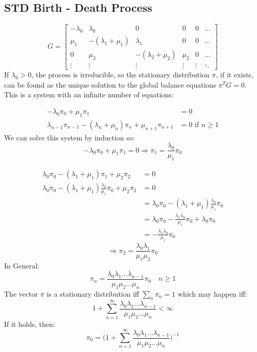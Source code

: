 \subsection{STD Birth - Death Process}
$$
G = \begin{bmatrix}
-\lambda_0 & \lambda_0 & 0 & 0 & 0 & \hdots \\
\mu_1 & -(\lambda_1 + \mu_1) & \lambda_1 & 0 & 0 & \hdots\\
0 & \mu_2 & -(\lambda_2 + \mu_2) & \mu_2 & 0 & \hdots\\
\vdots & \vdots & \vdots & \vdots & \vdots & \ddots
\end{bmatrix}
$$
If $\lambda_0 > 0 $, the process is irreducible, so the stationary distribution $\pi$, if it exists, can be found as the unique solution to the global balance equations $\pi^TG = 0$. This is a system with an infinite number of equations:

\begin{align*}
-\lambda_0\pi_0 + \mu_1\pi_1 &= 0\\
\lambda_{n-1}\pi_{n-1} - (\lambda_n + \mu_n)\pi_n + \mu_{n+1}\pi_{n+1} &= 0 \text{ if } n \geq 1
\end{align*}
We can solve this system by induction so:
$$
-\lambda_0\pi_0 + \mu_1\pi_1 = 0  \Rightarrow \pi_1 = \frac{\lambda_0}{\mu_1}\pi_0
$$

\begin{align*}
\lambda_{0}\pi_{0} - (\lambda_1 + \mu_1)\pi_1 + \mu_{2}\pi_{2} &= 0\\
\lambda_{0}\pi_{0} - (\lambda_1 + \mu_1)\frac{\lambda_0}{\mu_1}\pi_0 + \mu_{2}\pi_{2} &= 0\\
&= \lambda_0\pi_0 - (\lambda_1 + \mu_1)\frac{\lambda_0}{\mu_1}\pi_0\\
&= \lambda_0\pi_0 - \frac{\lambda_1\lambda_0}{\mu_1}\pi_0 +  \lambda_0\pi_0\\
&= - \frac{\lambda_1\lambda_0}{\mu_1}\pi_0
\end{align*}
$$
\Rightarrow \pi_2 = \frac{\lambda_0\lambda_1}{\mu_1\mu_2}\pi_0
$$
In General:
$$
\pi_n = \frac{\lambda_0\lambda_1 \hdots \lambda_{n-1}}{\mu_1\mu_2 \hdots \mu_n}\pi_0 \quad n \geq 1
$$
The vector $\pi$ is a stationary distribution iff $\sum_n \pi_n = 1$ which may happen iff:
$$
1 + \sum_{n = 1}^\infty \frac{\lambda_0\lambda_1 \hdots \lambda_{n-1}}{\mu_1\mu_2 \hdots \mu_n} < \infty
$$
If it holds, then:
$$
\pi_0 = \Bigg(1 + \sum_{n = 1}^\infty \frac{\lambda_0\lambda_1 \hdots \lambda_{n-1}}{\mu_1\mu_2 \hdots \mu_n}\Bigg)^{-1}
$$

